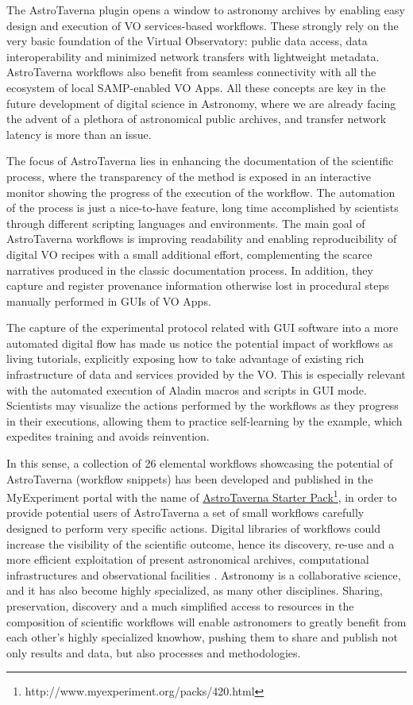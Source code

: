 \documentclass{aa}
\begin{document}
The AstroTaverna plugin opens a window to astronomy archives by enabling easy design and execution of VO services-based workflows. These strongly rely on the very basic foundation of the Virtual Observatory: public data access, data interoperability and minimized network transfers with lightweight metadata. AstroTaverna workflows also benefit from seamless connectivity with all the ecosystem of local SAMP-enabled VO Apps. All these concepts are key in the future development of digital science in Astronomy, where we are already facing the advent of a plethora of astronomical public archives, and transfer network latency is more than an issue. 

The focus of AstroTaverna lies in enhancing the documentation of the scientific process, where the transparency of the method is exposed in an interactive monitor showing the progress of the execution of the workflow. The automation of the process is just a nice-to-have feature, long time accomplished by scientists through different scripting languages and environments. The main goal of AstroTaverna workflows is improving readability and enabling reproducibility of digital VO recipes with a small additional effort, complementing the scarce narratives produced in the classic documentation process. In addition, they capture and register provenance information otherwise lost in procedural steps manually performed in GUIs of VO Apps. 

The capture of the experimental protocol related with GUI software into a more automated digital flow has made us notice the potential impact of workflows as living tutorials, explicitly exposing how to take advantage of existing rich infrastructure of data and services provided by the VO. This is especially relevant with the automated execution of Aladin macros and scripts in GUI mode. Scientists may visualize the actions performed by the workflows as they progress in their executions, allowing them to practice self-learning by the example, which expedites training and avoids reinvention. 

In this sense, a collection of 26 elemental workflows showcasing the potential of AstroTaverna (workflow snippets) has been developed and published in the MyExperiment portal with the name of \href{http://www.myexperiment.org/packs/420.html}{AstroTaverna Starter Pack}\footnote{http://www.myexperiment.org/packs/420.html}, in order to provide potential users of AstroTaverna a set of small workflows carefully designed to perform very specific actions. Digital libraries of workflows could increase the visibility of the scientific outcome, hence its discovery, re-use and a more efficient exploitation of present astronomical archives, computational infrastructures and observational facilities \citep{Ruiz2012}. Astronomy is a collaborative science, and it has also become highly specialized, as many other disciplines. Sharing, preservation, discovery and a much simplified access to resources in the composition of scientific workflows will enable astronomers to greatly benefit from each other’s highly specialized knowhow, pushing them to share and publish not only results and data, but also processes and methodologies.
\end{document}
